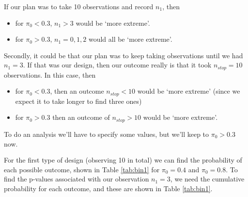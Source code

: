\documentclass[
  openany]{book}
\providecommand{\tightlist}{%
  \setlength{\itemsep}{0pt}\setlength{\parskip}{0pt}}
\theoremstyle{definition}
\theoremstyle{definition}
\theoremstyle{definition}
\theoremstyle{definition}
\theoremstyle{remark}
\begin{document}
If our plan was to take 10 observations and record \(n_1\), then

\begin{itemize}
\tightlist
\item
  for \(\pi_0<0.3\), \(n_1 > 3\) would be `more extreme'.
\item
  for \(\pi_0>0.3\), \(n_1 = 0,1,2\) would all be `more extreme'.
\end{itemize}

Secondly, it could be that our plan was to keep taking observations until we had \(n_1=3\). If that was our design, then our outcome really is that it took \(n_{stop}=10\) observations. In this case, then

\begin{itemize}
\tightlist
\item
  for \(\pi_0<0.3\), then an outcome \(n_{stop}<10\) would be `more extreme' (since we expect it to take longer to find three ones)
\item
  for \(\pi_0>0.3\) then an outcome of \(n_{stop}>10\) would be `more extreme'.
\end{itemize}

To do an analysis we'll have to specify some values, but we'll keep to \(\pi_0>0.3\) now.

For the first type of design (observing 10 in total) we can find the probability of each possible outcome, shown in Table \ref{tab:bin1} for \(\pi_0=0.4\) and \(\pi_0=0.8\). To find the p-values associated with our observation \(n_1=3\), we need the cumulative probability for each outcome, and these are shown in Table \ref{tab:bin1}.
\end{document}
